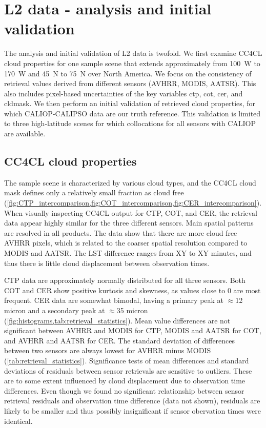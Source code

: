 \section{L2 data - analysis and initial validation}\label{L2_data}

The analysis and initial validation of L2 data is twofold. We first examine CC4CL cloud properties for one sample scene that extends approximately from 100\textdegree\ W to 170\textdegree\ W and 45\textdegree\ N to 75\textdegree\ N over North America. We focus on the consistency of retrieval values derived from different sensors (AVHRR, MODIS, AATSR). This also includes pixel-based uncertainties of the key variables ctp, cot, cer, and cldmask. We then perform an initial validation of retrieved cloud properties, for which CALIOP-CALIPSO data are our truth reference. This validation is limited to three high-latitude scenes for which collocations for all sensors with CALIOP are available.

\subsection{CC4CL cloud properties}

The sample scene is characterized by various cloud types, and the CC4CL cloud mask defines only a relatively small fraction as cloud free (\cref{fig:CTP_intercomparison,fig:COT_intercomparison,fig:CER_intercomparison}).  When visually inspecting CC4CL output for CTP, COT, and CER, the retrieval data appear highly similar for the three different sensors. Main spatial patterns are resolved in all products. The data show that there are more cloud free AVHRR pixels, which is related to the coarser spatial resolution compared to MODIS and AATSR. The LST difference ranges from XY to XY minutes, and thus there is little cloud displacement between observation times.
 
CTP data are approximately normally distributed for all three sensors. Both COT and CER show positive kurtosis and skewness, as values close to 0 are most frequent. CER data are somewhat bimodal, having a primary peak at $\approx$12 micron and a secondary peak at $\approx$35 micron (\cref{fig:histograms,tab:retrieval_statistics}). Mean value differences are not significant between AVHRR and MODIS for CTP, MODIS and AATSR for COT, and AVHRR and AATSR for CER. The standard deviation of differences between two sensors are always lowest for AVHRR minus MODIS (\cref{tab:retrieval_statistics}). Significance tests of mean differences and standard deviations of residuals between sensor retrievals are sensitive to outliers. These are to some extent influenced by cloud displacement due to observation time differences. Even though we found no significant relationship between sensor retrieval residuals and observation time difference (data not shown), residuals are likely to be smaller and thus possibly insignificant if sensor obervation times were identical.
 
